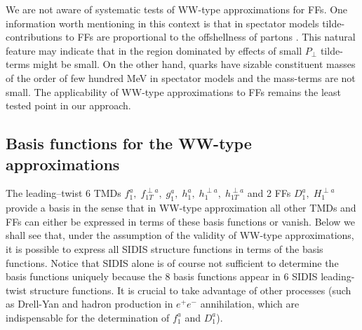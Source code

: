 \documentclass[a4paper,11pt]{article}
\newcommand{\red}[1]{{\color{red} #1}}
\newcommand{\AP}[1]{\red{#1}}
\begin{document}
We are not aware of systematic tests of WW-type approximations for FFs. One 
information worth mentioning in this context is that in spectator models 
\cite{Jakob:1997wg} tilde-contributions to FFs are proportional to the 
offshellness of partons %
\cite{Lorce:2014hxa,Lorce:2016ugb}. This
natural feature may indicate that in the region dominated by effects of
small $P_\perp$ tilde-terms might be small. On the other hand, quarks have 
sizable constituent masses of the order of few hundred MeV in spectator models 
and the mass-terms are not small. 
The applicability of WW-type approximations to FFs 
remains the least tested point in our approach.


\subsection{Basis functions for the WW-type approximations}
\label{Sec-3.7:basis}

The leading--twist 6 TMDs 
$f_1^a, \; f_{1T}^{\perp a}, \; g_1^a, \; h_1^a, \;h_1^{\perp a},\; h_{1T}^{\perp a}$
and 2 FFs $D_1^a, \; H_1^{\perp a}$ provide a basis
in the sense that in WW-type approximation all other TMDs and FFs 
can either be expressed in terms of these basis functions or vanish.
Below we shall see that, under the assumption of the validity of WW-type 
approximations, it is possible to express all SIDIS structure functions
in terms of the basis functions. \AP{Notice that SIDIS alone is of course not sufficient to determine
   the basis functions uniquely because the 8 basis functions appear
   in 6 SIDIS leading-twist structure functions. It is crucial to take advantage of
   other processes (such as Drell-Yan and hadron production in
   $e^+e^-$ annihilation, which are indispensable for the determination
   of $f_1^a$ and $D_1^a$).}
\end{document}

